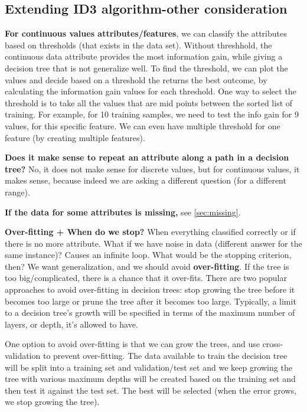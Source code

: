 \documentclass[12pt]{report}
\begin{document}
\subsection{Extending ID3 algorithm-other consideration}
\textbf{For continuous values attributes/features}, we can classify the attributes based on thresholds (that exists in the data set). Without threshhold, the continuous data attribute provides the most information gain, while giving a decision tree that is not generalize well. To find the threshold, we can plot the values and decide based on a threshold the returns the best outcome, by calculating the information gain values for each threshold. One way to select the threshold is to take all the values that are mid points between the sorted list of training. For example, for 10 training samples, we need to test the info gain for 9 values, for this specific feature. We can even have multiple threshold for one feature (by creating multiple features).

\textbf{Does it make sense to repeat an attribute along a path in a decision tree?} No, it does not make sense for discrete values, but for continuous values, it makes sense, because indeed we are asking a different question (for a different range).

\textbf{If the data for some attributes is missing,} see \ref{sec:missing}.

\textbf{Over-fitting + When do we stop?} When everything classified correctly or if there is no more attribute. What if we have noise in data (different answer for the same instance)? Causes an infinite loop. What would be the stopping criterion, then? We want generalization, and we should avoid \textbf{over-fitting}. If the tree is too big/complicated, there is a chance that it over-fits. There are two popular approaches to avoid over-fitting in decision trees: stop growing the tree before it becomes too large or prune the tree after it becomes too large. Typically, a limit to a decision tree’s growth will be specified in terms of the maximum number of layers, or depth, it’s allowed to have.

One option to avoid over-fitting is that we can grow the trees, and use cross-validation to prevent over-fitting. The data available to train the decision tree will be split into a training set and validation/test set and we keep growing the tree with various maximum depths will be created based on the training set and then test it against the test set. The best will be selected (when the error grows, we stop growing the tree).
\end{document}

